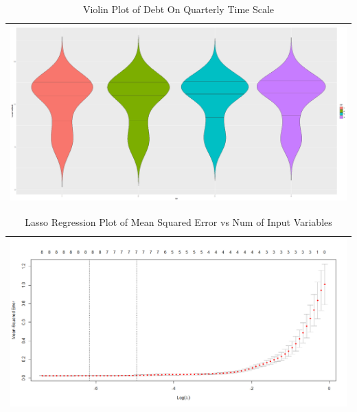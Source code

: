 \documentclass[sigconf,nonacm,11pt]{acmart}
\begin{document}
\begin{appendix}
\begin{table}[ht]
\caption{Violin Plot of Debt On Quarterly Time Scale}
\centering
\begin{tabular}{p{1.0\linewidth}}
\hline
\includegraphics[scale = 0.26]{QtrVSHouseholdDebt_violinPlot.png}\\
\hline
\end{tabular}
\end{table}

\begin{table}[ht]
\caption{Lasso Regression Plot of Mean Squared Error vs Num of Input Variables}
\centering
\begin{tabular}{p{1.0\linewidth}}
\hline
\includegraphics[scale = 0.26]{LASSORegression_Plot.png}\\
\hline
\end{tabular}
\end{table}


\end{appendix}
\end{document}

